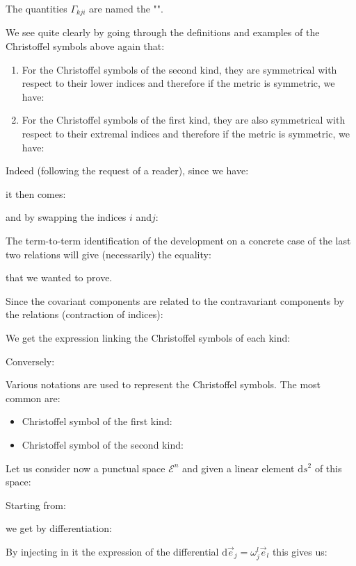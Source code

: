 	The quantities $\Gamma_{kji}$ are named the "".

	We see quite clearly by going through the definitions and examples of the Christoffel symbols above again that:
\begin{enumerate}
	\item For the Christoffel symbols of the second kind, they are symmetrical with respect to their lower indices and therefore if the metric is symmetric, we have:
	
	
	\item For the Christoffel symbols of the first kind, they are also symmetrical with respect to their extremal indices and therefore if the metric is symmetric, we have:
	
	\end{enumerate}
	Indeed (following the request of a reader), since we have:
	
	it then comes:
	
	and by swapping the indices $i$ and$ j$:
	
	The term-to-term identification of the development on a concrete case of the last two relations will give (necessarily) the equality:
	
	that we wanted to prove.

	Since the covariant components are related to the contravariant components by the relations (contraction of indices):
	
	We get the expression linking the Christoffel symbols of each kind:
	
	Conversely:
	
	\begin{tcolorbox}[title=Remark,colframe=black,arc=10pt]
	Various notations are used to represent the Christoffel symbols. The most common are:
	\begin{itemize}
		\item Christoffel symbol of the first kind:
		

		\item Christoffel symbol of the second kind:
		
	\end{itemize}
	\end{tcolorbox}
	Let us consider now a punctual space $\mathcal{E}^n$ and given a linear element $\mathrm{d}s^2$ of this space:
	
	Starting from:
	
	we get by differentiation:
	
	By injecting in it the expression of the differential $\mathrm{d}\vec{e}_j=\omega_j^l\vec{e}_l$ this gives us:
	
